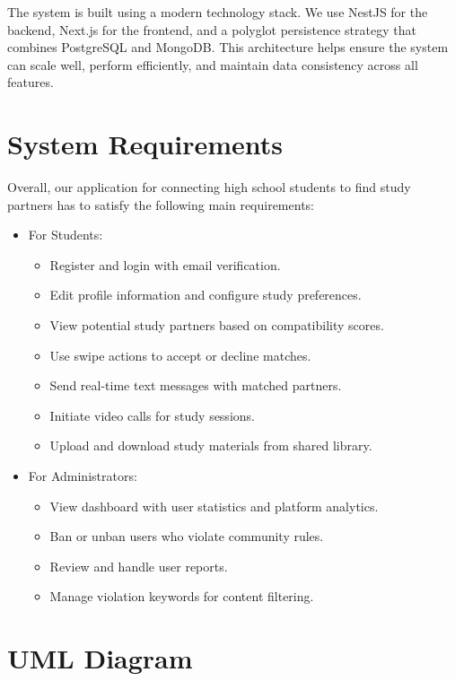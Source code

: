 \documentclass[a4paper,12pt]{report}
\begin{document}
The system is built using a modern technology stack. We use NestJS for the backend, Next.js for the frontend, and a polyglot persistence strategy that combines PostgreSQL and MongoDB. This architecture helps ensure the system can scale well, perform efficiently, and maintain data consistency across all features.

\section{System Requirements}

Overall, our application for connecting high school students to find study partners has to satisfy the following main requirements:

\begin{itemize}
    \item For Students:
    \begin{itemize}
        \item Register and login with email verification.
        \item Edit profile information and configure study preferences.
        \item View potential study partners based on compatibility scores.
        \item Use swipe actions to accept or decline matches.
        \item Send real-time text messages with matched partners.
        \item Initiate video calls for study sessions.
        \item Upload and download study materials from shared library.
    \end{itemize}
    
    \item For Administrators:
    \begin{itemize}
        \item View dashboard with user statistics and platform analytics.
        \item Ban or unban users who violate community rules.
        \item Review and handle user reports.
        \item Manage violation keywords for content filtering.
    \end{itemize}
\end{itemize}
\section{UML Diagram}
\end{document}
